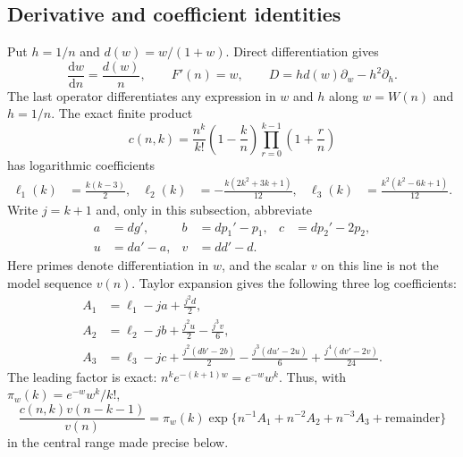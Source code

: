 \documentclass[11pt,letterpaper]{article}
\theoremstyle{remark}\newtheorem{remark}[theorem]{Remark}
\newcommand{\dd}{\mathrm d}\newcommand{\OO}{\mathcal O}
\begin{document}
\subsection{Derivative and coefficient identities}
Put $h=1/n$ and $d(w)=w/(1+w)$. Direct differentiation gives
\begin{equation}
 \frac{\dd w}{\dd n}=\frac{d(w)}n,\qquad F'(n)=w,
 \qquad D=hd(w)\partial_w-h^2\partial_h.\label{tak:eq:D}
\end{equation}
The last operator differentiates any expression in $w$ and $h$ along $w=W(n)$ and $h=1/n$.
The exact finite product
\begin{equation}
 c(n,k)=\frac{n^k}{k!}\left(1-\frac kn\right)
                   \prod_{r=0}^{k-1}\left(1+\frac rn\right)\label{tak:eq:product}
\end{equation}
has logarithmic coefficients
\begin{align}
 \ell_1(k)&=\frac{k(k-3)}2,&
 \ell_2(k)&=-\frac{k(2k^2+3k+1)}{12},&
 \ell_3(k)&=\frac{k^2(k^2-6k+1)}{12}.\label{tak:eq:ell123}
\end{align}
Write $j=k+1$ and, only in this subsection, abbreviate
\begin{align*}
 a&=dg',& b&=dp_1'-p_1,& c&=dp_2'-2p_2,\\
 u&=da'-a,& v&=dd'-d.
\end{align*}
Here primes denote differentiation in $w$, and the scalar $v$ on this line is not the model sequence $v(n)$. Taylor expansion gives the following three log coefficients:
\begin{align}
 A_1&=\ell_1-ja+\frac{j^2d}{2},\label{tak:eq:A123}\\
 A_2&=\ell_2-jb+\frac{j^2u}{2}-\frac{j^3v}{6},\nonumber\\
 A_3&=\ell_3-jc+\frac{j^2(db'-2b)}2
                   -\frac{j^3(du'-2u)}6+\frac{j^4(dv'-2v)}{24}.\nonumber
\end{align}
The leading factor is exact: $n^ke^{-(k+1)w}=e^{-w}w^k$. Thus, with $\pi_w(k)=e^{-w}w^k/k!$,
\begin{equation}
 \frac{c(n,k)v(n-k-1)}{v(n)}
  =\pi_w(k)\exp\{n^{-1}A_1+n^{-2}A_2+n^{-3}A_3+\text{remainder}\}\label{tak:eq:central}
\end{equation}
in the central range made precise below.
\end{document}
